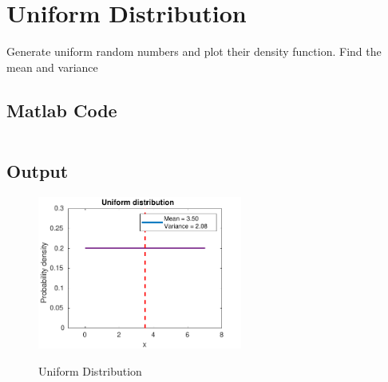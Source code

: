 \section{Uniform Distribution}
\label{sec:Uniform density function}

Generate uniform random numbers and plot
their density function. Find the mean and variance

\subsection{Matlab Code}

\inputminted[fontsize=\footnotesize,autogobble]{matlab}{code/uniform.m}

\subsection{Output}

\begin{figure}[!htb]
    \centering
    \includegraphics[width=0.6\textwidth]{res/figures/Figure_5.pdf}
    \label{output:uniform distribution}
    \caption{Uniform Distribution}
\end{figure}